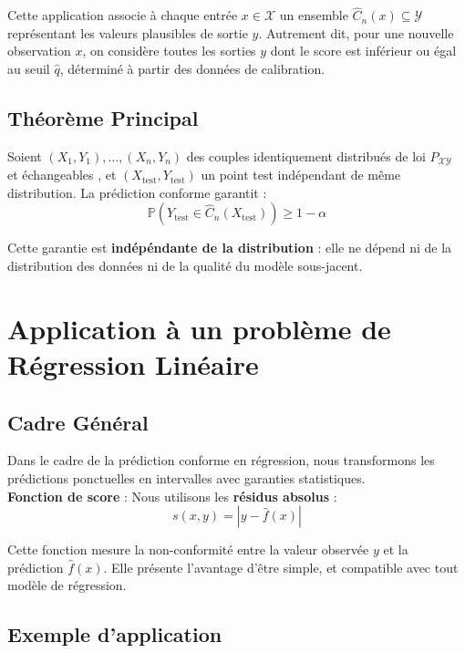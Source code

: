 \documentclass[a4paper,12pt]{article}
\begin{document}
    Cette application associe à chaque entrée $x \in \mathcal{X}$ un ensemble $\hat{C}_n(x) \subseteq \mathcal{Y}$ représentant les valeurs plausibles de sortie $y$. 
    Autrement dit, pour une nouvelle observation $x$, on considère toutes les sorties $y$ dont le score est inférieur ou égal au seuil $\hat{q}$, déterminé à partir des données de calibration. 



\subsection{Théorème Principal}

\begin{theorem}
Soient $(X_1, Y_1), \ldots, (X_n, Y_n)$ des couples identiquement distribués de loi $P_{\mathcal{X} \mathcal{Y}}$ et échangeables , et $(X_{\text{test}}, Y_{\text{test}})$ un point test indépendant de même distribution. La prédiction conforme garantit :
$$\mathbb{P}\left( Y_{\text{test}} \in \hat{C}_n(X_{\text{test}}) \right) \geq 1 - \alpha$$
\end{theorem}

Cette garantie est \textbf{indépéndante de la distribution} : elle ne dépend ni de la distribution des données ni de la qualité du modèle sous-jacent.

\section{Application à un problème de Régression Linéaire}

\subsection{Cadre Général}

Dans le cadre de la prédiction conforme en régression, nous transformons les prédictions ponctuelles en intervalles avec garanties statistiques.\\

\textbf{Fonction de score} : Nous utilisons les \textbf{résidus absolus} :
$$s(x, y) = |y - \hat{f}(x)|$$

Cette fonction mesure la non-conformité entre la valeur observée $y$ et la prédiction $\hat{f}(x)$. Elle présente l'avantage d'être simple, et compatible avec tout modèle de régression.

\subsection{Exemple d'application}
\end{document}
